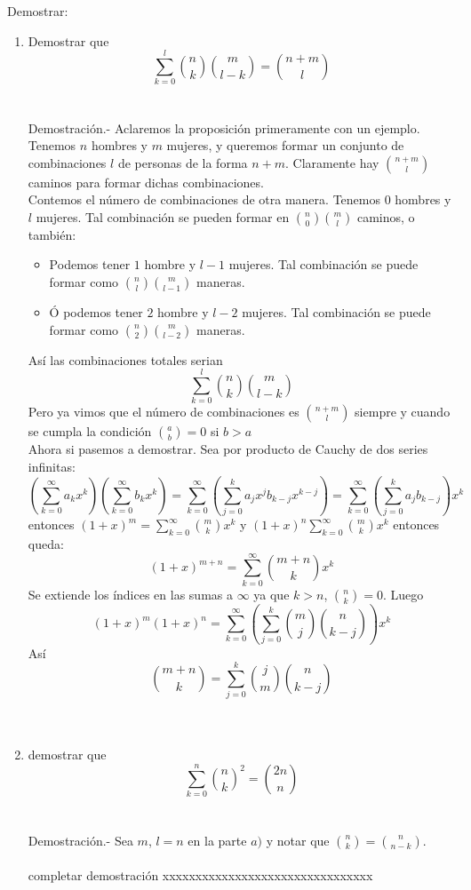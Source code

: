 \begin{teo}Demostrar:
\begin{enumerate}[\bfseries a)]
\item Demostrar que $$\displaystyle\sum_{k=0}^{l} {n \choose k} {m \choose l-k} = {n+m \choose l}$$\\\\
Demostración.- \; Aclaremos la proposición primeramente con un ejemplo.\\
Tenemos $n$ hombres y $m$ mujeres, y queremos formar un conjunto de combinaciones $l$ de personas de la forma $n+m$. Claramente hay ${n+m \choose l}$ caminos para formar dichas combinaciones.\\
Contemos el número de combinaciones de otra manera. Tenemos $0$ hombres y $l$ mujeres. Tal combinación se pueden formar en ${n \choose 0 } {m \choose l}$ caminos, o también:
\begin{itemize}
\item Podemos tener $1$ hombre y $l-1$ mujeres. Tal combinación se puede formar como ${n \choose l}{m \choose l-1}$ maneras.
\item Ó podemos tener $2$ hombre y $l-2$ mujeres. Tal combinación se puede formar como ${n \choose 2}{m \choose l-2}$ maneras.
\end{itemize}
Así las combinaciones totales serian $$\displaystyle\sum_{k=0}^l {n \choose k}{m \choose l -k}$$
Pero ya vimos que el número de combinaciones es ${n+m \choose l}$ siempre y cuando se cumpla la condición ${a \choose b} = 0$ si $b>a$\\
Ahora si pasemos a demostrar. Sea por producto de Cauchy de dos series infinitas:
$$\left( \displaystyle\sum_{k=0}^{\infty} a_k x^k \right) \left( \displaystyle\sum_{k=0}^{\infty} b_k x^k \right) = \sum_{k=0}^{\infty} \left( \displaystyle\sum_{j=0}^{k} a_j x^j b_{k-j} x^{k-j}\right) = \sum_{k=0}^{\infty} \left( \displaystyle\sum_{j=0}^{k} a_j b_{k-j} \right) x^k$$ entonces $(1+x)^m = \displaystyle\sum_{k=0}^{\infty} {m \choose k}x^k$ y $(1+x)^n \displaystyle\sum_{k=0}^{\infty} {m \choose k}x^k$ entonces queda:
$$(1+x)^{m+n} = \sum_{k=0}^{\infty} {m+n \choose k} x^k$$
Se extiende los índices en las sumas a $\infty$  ya que $k>n$, ${n \choose k} = 0 $. Luego 
$$(1+x)^m (1+x)^n = \displaystyle\sum_{k=0}^{\infty} \left( \sum_{j=0}^k {m \choose j} {n \choose k-j} \right) x^k$$ Así 
$${m+n \choose k} = \displaystyle\sum_{j=0}^k {j \choose m}{n \choose k-j}$$\\\\


\item demostrar que $$\displaystyle\sum_{k=0}^{n} {n \choose k}^2 = {2n \choose n}$$\\\\
Demostración.- \; Sea $m$, $l=n$ en la parte $a)$ y notar que ${n \choose k} = {n \choose n-k}.$ \\\\ {\color{green}completar demostración xxxxxxxxxxxxxxxxxxxxxxxxxxxxxxxx}
\end{enumerate}
\end{teo}

